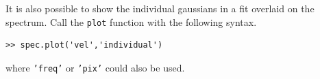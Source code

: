 \documentclass[11pt,a4paper]{article}
\begin{document}
It is also possible to show the individual gaussians in a fit overlaid
on the spectrum. Call the \texttt{plot} function with the following
syntax.
\begin{lstlisting}
>> spec.plot('vel','individual')
\end{lstlisting}
where \texttt{'freq'} or \texttt{'pix'} could also be used. 

\begin{figure}[h!]
  \centering

\end{figure}
\end{document}
